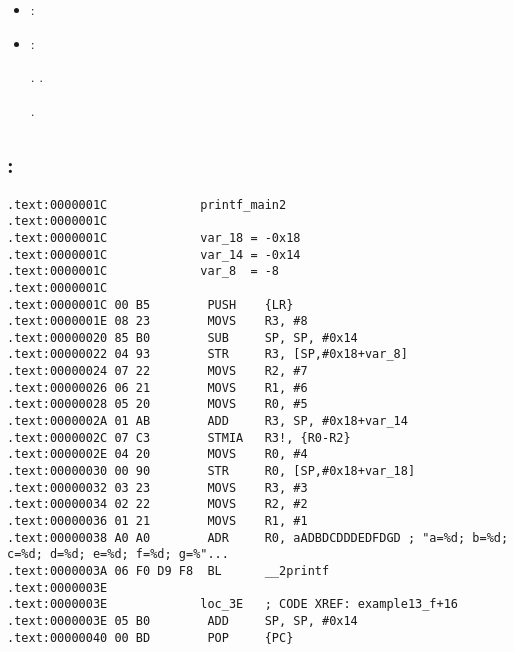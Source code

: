 \begin{itemize}
\item {}:

\item {}:

  
.
.

  
.

\end{itemize}

\subsection{\OptimizingKeil: \ThumbMode}

\begin{lstlisting}
.text:0000001C             printf_main2
.text:0000001C
.text:0000001C             var_18 = -0x18
.text:0000001C             var_14 = -0x14
.text:0000001C             var_8  = -8
.text:0000001C
.text:0000001C 00 B5        PUSH    {LR}
.text:0000001E 08 23        MOVS    R3, #8
.text:00000020 85 B0        SUB     SP, SP, #0x14
.text:00000022 04 93        STR     R3, [SP,#0x18+var_8]
.text:00000024 07 22        MOVS    R2, #7
.text:00000026 06 21        MOVS    R1, #6
.text:00000028 05 20        MOVS    R0, #5
.text:0000002A 01 AB        ADD     R3, SP, #0x18+var_14
.text:0000002C 07 C3        STMIA   R3!, {R0-R2}
.text:0000002E 04 20        MOVS    R0, #4
.text:00000030 00 90        STR     R0, [SP,#0x18+var_18]
.text:00000032 03 23        MOVS    R3, #3
.text:00000034 02 22        MOVS    R2, #2
.text:00000036 01 21        MOVS    R1, #1
.text:00000038 A0 A0        ADR     R0, aADBDCDDDEDFDGD ; "a=%d; b=%d; c=%d; d=%d; e=%d; f=%d; g=%"...
.text:0000003A 06 F0 D9 F8  BL      __2printf
.text:0000003E
.text:0000003E             loc_3E   ; CODE XREF: example13_f+16
.text:0000003E 05 B0        ADD     SP, SP, #0x14
.text:00000040 00 BD        POP     {PC}
\end{lstlisting}


